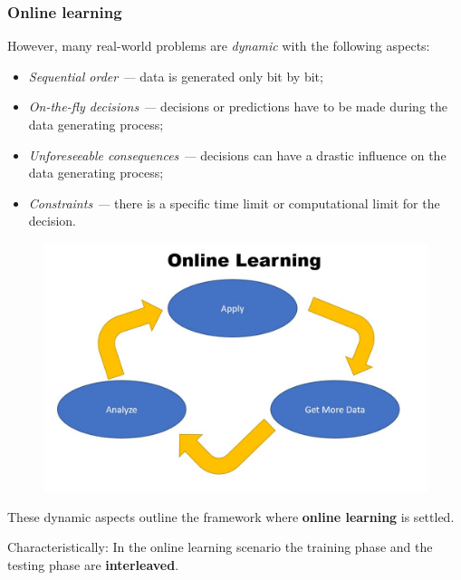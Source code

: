 \begin{frame}[t]
	\frametitle{Online learning}
%	
\begin{itemize} \small
%	
  	\item However, many real-world problems are \emph{dynamic} with the following aspects:
	\lz
	
	\begin{minipage}{.6\textwidth}
	\begin{itemize} \small
		\item \emph{Sequential order ---} data is generated only bit by bit;
		\item \emph{On-the-fly decisions ---} decisions or predictions have to be made during the data generating process;
		\item \emph{Unforeseeable consequences ---} decisions can have a drastic influence on the data generating process;
		\item \emph{Constraints ---} there is a specific time limit or computational limit for the decision.
	\end{itemize}
	\end{minipage}
	\begin{minipage}{.3\textwidth}
		\begin{figure}
		\centering
		\includegraphics[width=0.99\linewidth]{figure/online_learning}
		\end{figure}
	\end{minipage}
	\lz
	{ {	\item These dynamic aspects outline the framework where \textbf{online learning} is settled. 
	\item Characteristically: In the online learning scenario the training phase and the testing phase are \textbf{interleaved}.}}
	\end{itemize}
%	
\end{frame}


